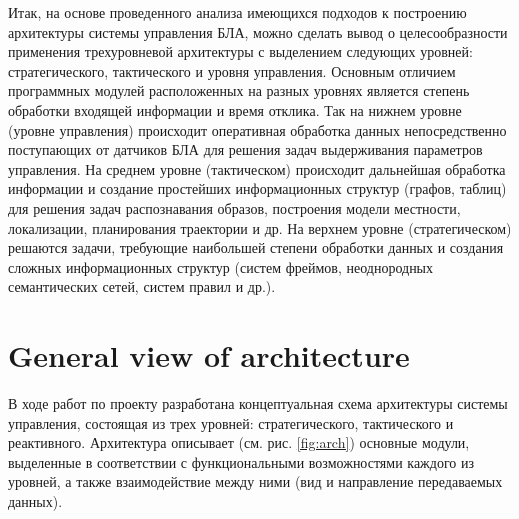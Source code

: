 \documentclass{svjour3}                     %
\begin{document}
Итак, на основе проведенного анализа имеющихся подходов к построению архитектуры системы управления БЛА, можно сделать вывод о целесообразности применения трехуровневой архитектуры с выделением следующих уровней: стратегического, тактического и уровня управления. Основным отличием программных модулей расположенных на разных уровнях является степень обработки входящей информации и время отклика. Так на нижнем уровне (уровне управления) происходит оперативная обработка данных непосредственно поступающих от датчиков БЛА для решения задач выдерживания параметров управления. На среднем уровне (тактическом) происходит дальнейшая обработка информации и создание простейших информационных структур (графов, таблиц) для решения задач распознавания образов, построения модели местности, локализации, планирования траектории и др. На верхнем уровне (стратегическом) решаются задачи, требующие наибольшей степени обработки данных и создания сложных информационных структур (систем фреймов, неоднородных семантических сетей, систем правил и др.).


\section{General view of architecture}
\label{sec:2}
В ходе работ по проекту разработана концептуальная схема архитектуры системы управления, состоящая из трех уровней: стратегического, тактического и реактивного. Архитектура описывает (см. рис. \ref{fig:arch}) основные модули, выделенные в соответствии с функциональными возможностями каждого из уровней, а также взаимодействие между ними (вид и направление передаваемых данных). 
\end{document}
